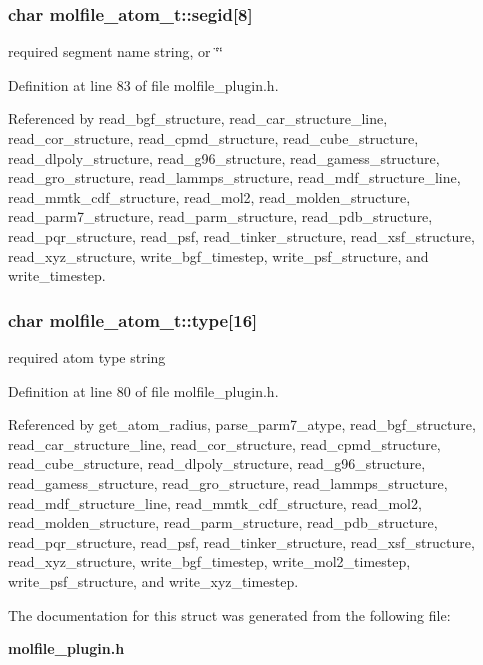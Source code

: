 \subsubsection{\setlength{\rightskip}{0pt plus 5cm}char molfile\_\-atom\_\-t::segid[8]}\label{structmolfile__atom__t_m4}


required segment name string, or \char`\"{}\char`\"{} 

Definition at line 83 of file molfile\_\-plugin.h.

Referenced by read\_\-bgf\_\-structure, read\_\-car\_\-structure\_\-line, read\_\-cor\_\-structure, read\_\-cpmd\_\-structure, read\_\-cube\_\-structure, read\_\-dlpoly\_\-structure, read\_\-g96\_\-structure, read\_\-gamess\_\-structure, read\_\-gro\_\-structure, read\_\-lammps\_\-structure, read\_\-mdf\_\-structure\_\-line, read\_\-mmtk\_\-cdf\_\-structure, read\_\-mol2, read\_\-molden\_\-structure, read\_\-parm7\_\-structure, read\_\-parm\_\-structure, read\_\-pdb\_\-structure, read\_\-pqr\_\-structure, read\_\-psf, read\_\-tinker\_\-structure, read\_\-xsf\_\-structure, read\_\-xyz\_\-structure, write\_\-bgf\_\-timestep, write\_\-psf\_\-structure, and write\_\-timestep.
\subsubsection{\setlength{\rightskip}{0pt plus 5cm}char molfile\_\-atom\_\-t::type[16]}\label{structmolfile__atom__t_m1}


required atom type string 

Definition at line 80 of file molfile\_\-plugin.h.

Referenced by get\_\-atom\_\-radius, parse\_\-parm7\_\-atype, read\_\-bgf\_\-structure, read\_\-car\_\-structure\_\-line, read\_\-cor\_\-structure, read\_\-cpmd\_\-structure, read\_\-cube\_\-structure, read\_\-dlpoly\_\-structure, read\_\-g96\_\-structure, read\_\-gamess\_\-structure, read\_\-gro\_\-structure, read\_\-lammps\_\-structure, read\_\-mdf\_\-structure\_\-line, read\_\-mmtk\_\-cdf\_\-structure, read\_\-mol2, read\_\-molden\_\-structure, read\_\-parm\_\-structure, read\_\-pdb\_\-structure, read\_\-pqr\_\-structure, read\_\-psf, read\_\-tinker\_\-structure, read\_\-xsf\_\-structure, read\_\-xyz\_\-structure, write\_\-bgf\_\-timestep, write\_\-mol2\_\-timestep, write\_\-psf\_\-structure, and write\_\-xyz\_\-timestep.

The documentation for this struct was generated from the following file:\begin{CompactItemize}
\item 
{\bf molfile\_\-plugin.h}\end{CompactItemize}
